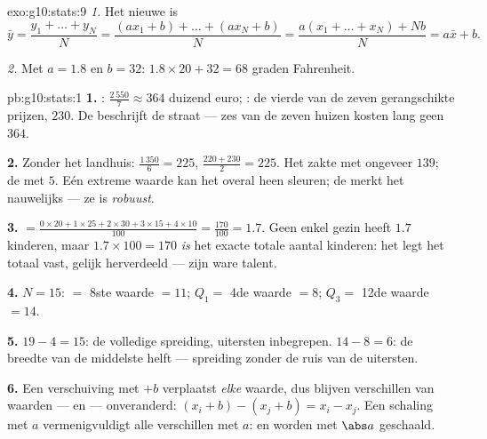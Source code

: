\begin{solution}{exo:g10:stats:9}
\emph{1.} Het nieuwe  is
\[
\bar y = \frac{y_1 + \dots + y_N}{N}
= \frac{(a x_1 + b) + \dots + (a x_N + b)}{N}
= \frac{a(x_1 + \dots + x_N) + Nb}{N}
= a \bar x + b .
\]

\emph{2.} Met $a = 1.8$ en $b = 32$: 
$1.8 \times 20 + 32 = 68$ graden Fahrenheit.
\end{solution}

\begin{solution}{pb:g10:stats:1}
\textbf{1.} : $\frac{2\,550}{7} \approx 364$ duizend euro;
: de vierde van de zeven gerangschikte prijzen, $230$. De 
beschrijft de straat --- zes van de zeven huizen kosten lang geen $364$.

\textbf{2.} Zonder het landhuis:  $\frac{1\,350}{6} = 225$,
 $\frac{220 + 230}{2} = 225$. Het  zakte met ongeveer
$139$; de  met $5$. Eén extreme waarde kan het  overal heen
sleuren; de  merkt het nauwelijks --- ze is \emph{robuust}.

\textbf{3.}  $= \frac{0 \times 20 + 1 \times 25 + 2 \times 30 +
3 \times 15 + 4 \times 10}{100} = \frac{170}{100} = 1.7$. Geen enkel gezin
heeft $1.7$ kinderen, maar $1.7 \times 100 = 170$ \emph{is} het exacte
totale aantal kinderen: het  legt het totaal vast, gelijk
herverdeeld --- zijn ware talent.

\textbf{4.} $N = 15$:  $=$ 8ste waarde $= 11$; $Q_1 =$ 4de waarde
$= 8$; $Q_3 =$ 12de waarde $= 14$.

\textbf{5.}  $19 - 4 = 15$: de volledige spreiding, uitersten
inbegrepen.  $14 - 8 = 6$: de breedte van de middelste
helft --- spreiding zonder de ruis van de uitersten.

\textbf{6.} Een verschuiving met $+b$ verplaatst \emph{elke} waarde, dus
blijven verschillen van waarden ---  en 
--- onveranderd: $(x_i + b) - (x_j + b) = x_i - x_j$. Een schaling met $a$
vermenigvuldigt alle verschillen met $a$:  en
 worden met $\abs a$ geschaald.


\end{solution}
